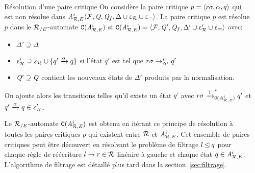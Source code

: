 \begin{definition}{Résolution d'une paire critique}
  \label{def:resolution_cp}
  On considère la paire critique $p=\langle r\sigma, \alpha, q \rangle$ qui est non résolue dans
  ${\mathit A}_{\mathcal R,E}^i \langle \mathcal{F}, \mathit Q, \mathit Q_f, \Delta\cup \upvarepsilon_{\mathcal R}\cup \upvarepsilon_{=} \rangle$.
  La paire critique $p$ est résolue $p$ dans le ${\mathcal R_{/E}}$-automate $\mathtt{C}({\mathit A}_{\mathcal R,E}^i)$
  si $\mathtt{C}({\mathit A}_{\mathcal R,E}^i) = \langle \mathcal{F}, \mathit Q', \mathit Q_f, \Delta'\cup \upvarepsilon_{\mathcal R}'\cup \upvarepsilon_{=} \rangle$ avec:
  \begin{itemize}
  \item $\Delta'\supseteq \Delta$%
  \item $\upvarepsilon_{\mathcal R}'\supseteq \upvarepsilon_{\mathcal R} \cup \{q' \xrightarrow{\alpha} q\}$ si l'état $q'$ est tel que $r\sigma \rightarrow^*_{\Delta'} q'$
  \item $\mathit Q' \supseteq \mathit Q$ contient les nouveaux états de $\Delta'$ produits par la normalisation.
  \end{itemize}
\end{definition}

On ajoute alors les transitions telles qu'il existe un état $q'$ avec
$r\sigma \xrightarrow{\top}_{\mathtt{C}({\mathit A}_{\mathcal R,E}^i)}^* q'$ et $q'\xrightarrow{\alpha} q \in \upvarepsilon_{\mathcal R}'$. 

Le ${\mathcal R_{/E}}$-automate $\mathtt{C}({\mathit A}_{\mathcal R,E}^i)$ est obtenu en itérant ce
principe de résolution à toutes les paires critiques $p$ qui existent
entre $\mathcal R$ et ${\mathit A}_{\mathcal R,E}^i$. Cet ensemble de paires critiques peut être découvert
en résolvant le problème de filtrage $l \unlhd q$ pour chaque règle de
réécriture $l \rightarrow r\in \mathcal R$ linéaire à gauche et chaque état $q\in{\mathit A}_{\mathcal R,E}^i$.
L'algorithme de filtrage est détaillé plus tard dans la section~\ref{sec:filtrage}.

